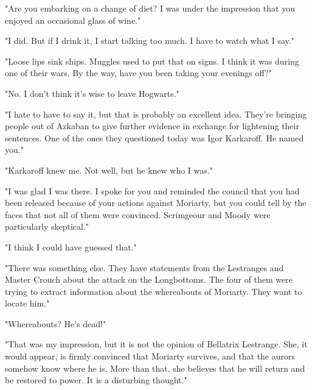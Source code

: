 "Are you embarking on a change of diet? I was under the impression that you enjoyed an occasional glass of wine."

"I did. But if I drink it, I start talking too much. I have to watch what I say."

"Loose lips sink ships. Muggles used to put that on signs. I think it was during one of their wars. By the way, have you been taking your evenings off?"

"No. I don't think it's wise to leave Hogwarts."

"I hate to have to say it, but that is probably an excellent idea. They're bringing people out of Azkaban to give further evidence in exchange for lightening their sentences. One of the ones they questioned today was Igor Karkaroff. He named you."

"Karkaroff knew me. Not well, but he knew who I was."

"I was glad I was there. I spoke for you and reminded the council that you had been released because of your actions against Moriarty, but you could tell by the faces that not all of them were convinced. Scrimgeour and Moody were particularly skeptical."

"I think I could have guessed that."

"There was something else. They have statements from the Lestranges and Master Crouch about the attack on the Longbottoms. The four of them were trying to extract information about the whereabouts of Moriarty. They want to locate him."

"Whereabouts? He's dead!"

"That was my impression, but it is not the opinion of Bellatrix Lestrange. She, it would appear, is firmly convinced that Moriarty survives, and that the aurors somehow know where he is. More than that, she believes that he will return and be restored to power. It is a disturbing thought."


